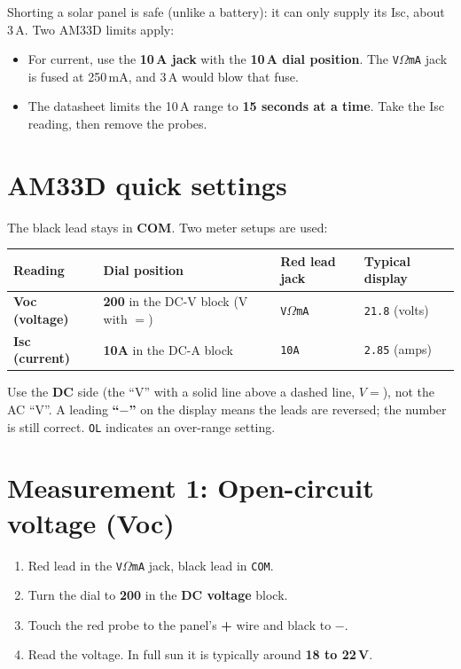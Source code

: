 \documentclass[11pt]{article}
\begin{document}
\begin{warn}
Shorting a solar panel is safe (unlike a battery): it can only supply its Isc, about
3\,A. Two AM33D limits apply:
\begin{itemize}[leftmargin=1.4em,topsep=2pt]
  \item For current, use the \textbf{10\,A jack} with the \textbf{10\,A dial position}.
        The \texttt{V$\Omega$mA} jack is fused at 250\,mA, and 3\,A would blow that fuse.
  \item The datasheet limits the 10\,A range to \textbf{15 seconds at a time}. Take the
        Isc reading, then remove the probes.
\end{itemize}
\end{warn}

\section{AM33D quick settings}
The black lead stays in \textbf{COM}. Two meter setups are used:

\begin{center}
\begin{tabular}{|>{\bfseries}l|l|l|l|}
\hline
Reading & Dial position & Red lead jack & Typical display \\ \hline
Voc (voltage) & \textbf{200} in the DC-V block (V with $=$) & \texttt{V$\Omega$mA} & \texttt{21.8} (volts) \\ \hline
Isc (current) & \textbf{10A} in the DC-A block & \texttt{10A} & \texttt{2.85} (amps) \\ \hline
\end{tabular}
\end{center}

\begin{note}
Use the \textbf{DC} side (the ``V'' with a solid line above a dashed line, \(V\!=\)),
not the AC ``V\raisebox{0.2ex}{$\sim$}''. A leading \textbf{``$-$''} on the display means
the leads are reversed; the number is still correct. \texttt{OL} indicates an over-range
setting.
\end{note}

\section{Measurement 1: Open-circuit voltage (Voc)}
\begin{enumerate}
  \item Red lead in the \texttt{V$\Omega$mA} jack, black lead in \texttt{COM}.
  \item Turn the dial to \textbf{200} in the \textbf{DC voltage} block.
  \item Touch the red probe to the panel's \textbf{+} wire and black to \textbf{$-$}.
  \item Read the voltage. In full sun it is typically around \textbf{18 to 22\,V}.
\end{enumerate}
\end{document}

